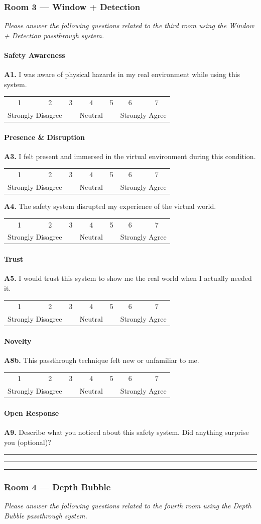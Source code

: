 \documentclass{styling/vgtc} %
\makeatletter
\newcommand{\likert}{%
  \par\smallskip
  \begin{center}\small
  \begin{tabular}{@{}ccccccc@{}}
    1 & 2 & 3 & 4 & 5 & 6 & 7 \\[-2pt]
    \multicolumn{2}{l}{\scriptsize Strongly Disagree} &
    & {\scriptsize Neutral} &
    & \multicolumn{2}{r}{\scriptsize Strongly Agree}
  \end{tabular}
  \end{center}\smallskip\noindent}
\newcommand{\answerlines}{%
  \par\vspace{4pt}%
  \noindent\rule{\linewidth}{0.3pt}\par\vspace{10pt}%
  \noindent\rule{\linewidth}{0.3pt}\par\vspace{10pt}%
  \noindent\rule{\linewidth}{0.3pt}\par\vspace{6pt}}
\makeatother
\begin{document}
\subsubsection*{Room 3 --- Window + Detection}

\noindent\textit{Please answer the following questions related to the third room using the Window + Detection passthrough system.}

\paragraph{Safety Awareness}
\noindent\textbf{A1.} I was aware of physical hazards in my real environment while using this system.\likert

\paragraph{Presence \& Disruption}
\noindent\textbf{A3.} I felt present and immersed in the virtual environment during this condition.\likert

\noindent\textbf{A4.} The safety system disrupted my experience of the virtual world.\likert

\paragraph{Trust}
\noindent\textbf{A5.} I would trust this system to show me the real world when I actually needed it.\likert

\paragraph{Novelty}
\noindent\textbf{A8b.} This passthrough technique felt new or unfamiliar to me.\likert

\paragraph{Open Response}
\noindent\textbf{A9.} Describe what you noticed about this safety system. Did anything surprise you (optional)?\answerlines

\subsubsection*{Room 4 --- Depth Bubble}

\noindent\textit{Please answer the following questions related to the fourth room using the Depth Bubble passthrough system.}
\end{document}
